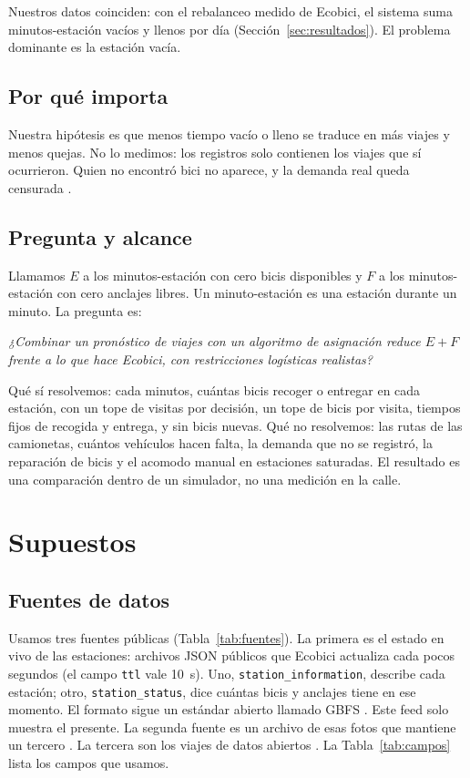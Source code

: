 \documentclass[conference,letterpaper,10pt]{IEEEtran}
\newcommand{\EF}{E+F}
\begin{document}
Nuestros datos coinciden: con el rebalanceo medido de Ecobici, el sistema suma \recoE{} minutos-estación vacíos y \recoF{} llenos por día (Sección~\ref{sec:resultados}). El problema dominante es la estación vacía.

\subsection{Por qué importa}
Nuestra hipótesis es que menos tiempo vacío o lleno se traduce en más viajes y menos quejas. No lo medimos: los registros solo contienen los viajes que sí ocurrieron. Quien no encontró bici no aparece, y la demanda real queda censurada \cite{negahban2019}.

\subsection{Pregunta y alcance}
Llamamos $E$ a los minutos-estación con cero bicis disponibles y $F$ a los minutos-estación con cero anclajes libres. Un minuto-estación es una estación durante un minuto. La pregunta es:

\emph{¿Combinar un pronóstico de viajes con un algoritmo de asignación reduce $\EF$ frente a lo que hace Ecobici, con restricciones logísticas realistas?}

Qué sí resolvemos: cada \rstepMin{} minutos, cuántas bicis recoger o entregar en cada estación, con un tope de visitas por decisión, un tope de bicis por visita, tiempos fijos de recogida y entrega, y sin bicis nuevas. Qué no resolvemos: las rutas de las camionetas, cuántos vehículos hacen falta, la demanda que no se registró, la reparación de bicis y el acomodo manual en estaciones saturadas. El resultado es una comparación dentro de un simulador, no una medición en la calle.

\section{Supuestos}\label{sec:supuestos}
\subsection{Fuentes de datos}\label{sec:fuentes}
Usamos tres fuentes públicas (Tabla~\ref{tab:fuentes}). La primera es el estado en vivo de las estaciones: archivos JSON públicos que Ecobici actualiza cada pocos segundos (el campo \texttt{ttl} vale 10~s). Uno, \texttt{station\_information}, describe cada estación; otro, \texttt{station\_status}, dice cuántas bicis y anclajes tiene en ese momento. El formato sigue un estándar abierto llamado GBFS \cite{gbfs}. Este feed solo muestra el presente. La segunda fuente es un archivo de esas fotos que mantiene un tercero \cite{halford_bsh}. La tercera son los viajes de datos abiertos \cite{ecobici_datos}. La Tabla~\ref{tab:campos} lista los campos que usamos.
\end{document}
